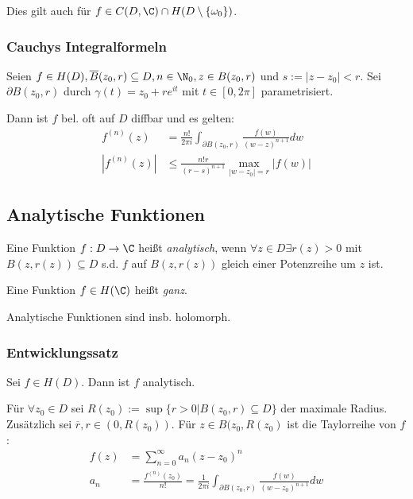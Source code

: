 Dies gilt auch für \(f \in C(D,\C) \cap H(D\setminus \{\omega_0\})\).

\subsubsection*{Cauchys Integralformeln}

Seien \(f \in H(D), \overline B(z_0,r) \subseteq D, n \in \N_0, z \in B(z_0,r)\) und \(s := |z-z_0| < r\). Sei \(\partial B(z_0,r)\) durch \(\gamma(t) = z_0 + re^{it}\) mit \(t \in [0,2\pi]\) parametrisiert.

Dann ist \(f\) bel. oft auf \(D\) diffbar und es gelten:
\begin{align*}
	f^{(n)}(z) &= \frac{n!}{2\pi i} \int_{\partial B(z_0,r)} \frac{f(w)}{(w-z)^{n+1}} dw \\
	|f^{(n)}(z)| &\leq \frac{n!r}{(r-s)^{n+1}} \max_{|w-z_0|=r} |f(w)|
\end{align*}

\subsection*{Analytische Funktionen}

Eine Funktion \(f : D \to \C\) heißt \emph{analytisch}, wenn \(\forall z \in D \exists r(z) > 0\) mit \(B(z,r(z)) \subseteq D\) s.d. \(f\) auf \(B(z,r(z))\) gleich einer Potenzreihe um \(z\) ist.

\vspace*{1mm}

Eine Funktion \(f \in H(\C)\) heißt \emph{ganz}.

\vspace*{1mm}

Analytische Funktionen sind insb. holomorph.

\subsubsection*{Entwicklungssatz}

Sei \(f \in H(D)\). Dann ist \(f\) analytisch.

\spacing

Für \(\forall z_0 \in D\) sei \(R(z_0) := \sup\{r > 0 | B(z_0,r) \subseteq D \}\) der maximale Radius. Zusätzlich sei \(\overline r, r \in (0,R(z_0))\). Für \(z \in B(z_0, R(z_0)\) ist die Taylorreihe von \(f\):
\begin{align*}
f(z) &= \sum_{n=0}^\infty a_n(z-z_0)^n \\
a_n &= \frac{f^{(n)}(z_0)}{n!} = \frac{1}{2\pi i} \int_{\partial B(z_0,r)} \frac{f(w)}{(w-z_0)^{n+1}} dw
\end{align*}

